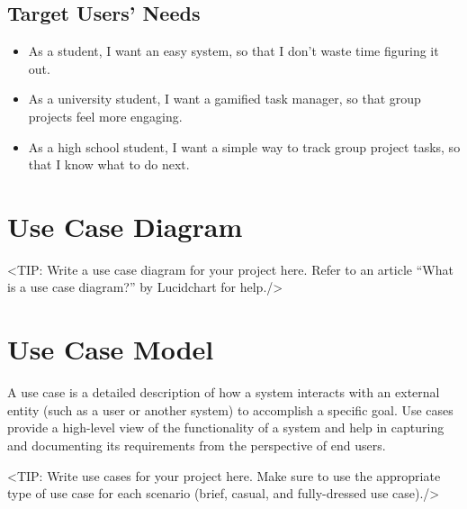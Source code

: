 \subsection{Target Users' Needs}
\begin{itemize}
    \item As a student, I want an easy system, so that I don’t waste time figuring it out.
    \item As a university student, I want a gamified task manager, so that group projects feel more engaging.
    \item As a high school student, I want a simple way to track group project tasks, so that I know what to do next.
\end{itemize}



\section{Use Case Diagram}
\label{section:use-case-diagram}
<TIP: Write a use case diagram for your project here. Refer to an
article “What is a use case diagram?” by Lucidchart for help./>

\section{Use Case Model}
\label{section:use-case-model}
A use case is a detailed description of how a system
interacts with an external entity (such as a user or another system) to
accomplish a specific goal. Use cases provide a high-level view of the
functionality of a system and help in capturing and documenting its
requirements from the perspective of end users.

<TIP: Write use cases for your project here. Make sure to use the
appropriate type of use case for each scenario (brief, casual, and fully-dressed
use case)./>

\newpage
